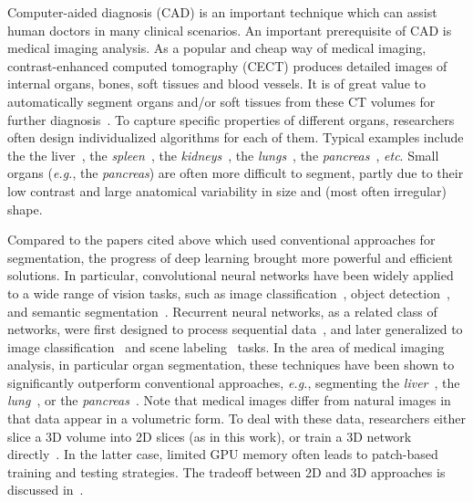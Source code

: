 \documentclass[10pt,twocolumn,letterpaper]{article}
\begin{document}
Computer-aided diagnosis (CAD) is an important technique which can assist human doctors in many clinical scenarios.
An important prerequisite of CAD is medical imaging analysis.
As a popular and cheap way of medical imaging,
contrast-enhanced computed tomography (CECT) produces detailed images of internal organs, bones, soft tissues and blood vessels.
It is of great value to automatically segment organs and/or soft tissues from these CT volumes
for further diagnosis~\cite{Brosch_2016_Deep}\cite{Wang_2016_Deep}\cite{Havaei_2017_Brain}\cite{Zhou_2017_Deep}.
To capture specific properties of different organs, researchers often design individualized algorithms for each of them.
Typical examples include the the liver~\cite{Ling_2008_Hierarchical}\cite{Heimann_2009_Comparison},
the {\em spleen}~\cite{Linguraru_2010_Automated}, the {\em kidneys}~\cite{Lin_2006_Computer}\cite{Ali_2007_Graph},
the {\em lungs}~\cite{Hu_2001_Automatic}, the {\em pancreas}~\cite{Chu_2013_Multi}\cite{Wang_2014_Geodesic}, {\em etc}.
Small organs ({\em e.g.}, the {\em pancreas}) are often more difficult to segment,
partly due to their low contrast and large anatomical variability in size and (most often irregular) shape.

Compared to the papers cited above which used conventional approaches for segmentation,
the progress of deep learning brought more powerful and efficient solutions.
In particular, convolutional neural networks have been widely applied to a wide range of vision tasks,
such as image classification~\cite{Krizhevsky_2012_ImageNet}\cite{Simonyan_2015_Very}\cite{He_2016_Deep},
object detection~\cite{Girshick_2014_Rich}\cite{Ren_2015_Faster},
and semantic segmentation~\cite{Long_2015_Fully}\cite{Chen_2015_Semantic}.
Recurrent neural networks, as a related class of networks,
were first designed to process sequential data~\cite{Graves_2013_Speech}\cite{Socher_2011_Parsing},
and later generalized to image classification~\cite{Liang_2015_Recurrent} and scene labeling~\cite{Pinheiro_2014_Recurrent} tasks.
In the area of medical imaging analysis, in particular organ segmentation,
these techniques have been shown to significantly outperform conventional approaches,
{\em e.g.}, segmenting the {\em liver}~\cite{Dou_2016_3D}, the {\em lung}~\cite{Harrison_2017_Progressive},
or the {\em pancreas}~\cite{Roth_2016_Spatial}\cite{Cai_2017_Improving}\cite{Roth_2017_Spatial}.
Note that medical images differ from natural images in that data appear in a volumetric form.
To deal with these data, researchers either slice a 3D volume into 2D slices (as in this work),
or train a 3D network
directly~\cite{Merkow_2016_Dense}\cite{Milletari_2016_VNet}\cite{Kamnitsas_2017_Efficient}\cite{Yu_2017_Volumetric}.
In the latter case, limited GPU memory often leads to patch-based training and testing strategies.
The tradeoff between 2D and 3D approaches is discussed in~\cite{Lai_2015_Deep}.
\end{document}
